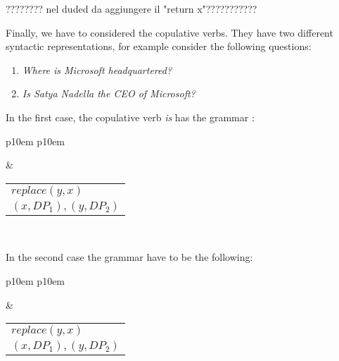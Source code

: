???????? nel duded da aggiungere il "return x"???????????

Finally, we have to considered the copulative verbs. They have two different syntactic representations, for example consider the following questions:
\begin{enumerate}
\item \textit{Where is Microsoft headquartered?}
\item \textit{Is Satya Nadella the CEO of Microsoft?}
\end{enumerate}
In the first case, the copulative verb \textit{is} has the grammar :
\medskip
\begin{center}
\begin{tabular}{ p{10em} p{10em} }
	\label{tbl:grammar.is}
	
	\begin{center}
		\begin{tikzpicture}
		\Tree [.S [.DP$_1\downarrow$ ] [.VP [.V is ] DP$_2\downarrow$ ] ]	
		\end{tikzpicture}
	\end{center}
	
	&

	\begin{center}
		\begin{tabular}{|c|l|}
			\hline
			\mbox{} & \mbox{}\\
			\hline
			\multicolumn{2}{|l|}{
				$replace(y,x)$
			} \\
			\hline
			\multicolumn{2}{|l|}{
				$(x,DP_{1}),(y,DP_{2})$
			} \\
			\hline
		\end{tabular}
	\end{center}	
	\\
\end{tabular}
\end{center}
\medskip

In the second case the grammar have to be the following:
\medskip
\begin{center}
\begin{tabular}{ p{10em} p{10em} }
	\label{tbl:grammar.is}
	
	\begin{center}
		\begin{tikzpicture}
		\Tree [.S [.VP [.V is ] DP$_1\downarrow$ ] [.DP$_2\downarrow$ ] ]	
		\end{tikzpicture}
	\end{center}
	
	&

	\begin{center}
		\begin{tabular}{|c|l|}
			\hline
			\mbox{} & \mbox{}\\
			\hline
			\multicolumn{2}{|l|}{
				$replace(y,x)$
			} \\
			\hline
			\multicolumn{2}{|l|}{
				$(x,DP_{1}),(y,DP_{2})$
			} \\
			\hline
		\end{tabular}
	\end{center}	
	\\
\end{tabular}
\end{center}
\medskip